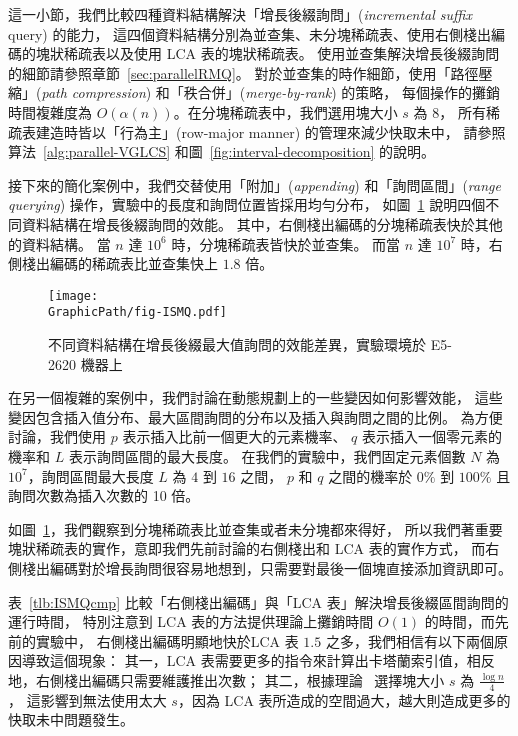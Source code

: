 這一小節，我們比較四種資料結構解決「增長後綴詢問」({\em incremental suffix} query) 的能力，
這四個資料結構分別為並查集、未分塊稀疏表、使用右側棧出編碼的塊狀稀疏表以及使用 LCA 表的塊狀稀疏表。
使用並查集解決增長後綴詢問的細節請參照章節~\ref{sec:parallelRMQ}。
對於並查集的時作細節，使用「路徑壓縮」({\em path compression}) 和「秩合併」({\em merge-by-rank}) 的策略，
每個操作的攤銷時間複雜度為 $O(\alpha(n))$。在分塊稀疏表中，我們選用塊大小 $s$ 為 $8$，
所有稀疏表建造時皆以「行為主」(row-major manner) 的管理來減少快取未中，
請參照算法~\ref{alg:parallel-VGLCS} 和圖~\ref{fig:interval-decomposition} 的說明。


接下來的簡化案例中，我們交替使用「附加」({\em appending}) 
和「詢問區間」({\em range querying}) 操作，實驗中的長度和詢問位置皆採用均勻分布，
如圖~\ref{fig:fig-ISMQcmp} 說明四個不同資料結構在增長後綴詢問的效能。
其中，右側棧出編碼的分塊稀疏表快於其他的資料結構。
當 $n$ 達 $10^6$ 時，分塊稀疏表皆快於並查集。
而當 $n$ 達 $10^7$ 時，右側棧出編碼的稀疏表比並查集快上 $1.8$ 倍。

\begin{figure}[!thb]
  \centering
  \texttt{[image: \\GraphicPath/fig-ISMQ.pdf]}
  \caption{
    不同資料結構在增長後綴最大值詢問的效能差異，實驗環境於 E5-2620 機器上}
  \label{fig:fig-ISMQcmp}
\end{figure}

在另一個複雜的案例中，我們討論在動態規劃上的一些變因如何影響效能，
這些變因包含插入值分布、最大區間詢問的分布以及插入與詢問之間的比例。
為方便討論，我們使用 $p$ 表示插入比前一個更大的元素機率、
$q$ 表示插入一個零元素的機率和 $L$ 表示詢問區間的最大長度。
在我們的實驗中，我們固定元素個數 $N$ 為 $10^7$，詢問區間最大長度 $L$ 為 $4$ 到 $16$ 之間，
$p$ 和 $q$ 之間的機率於 $0 \%$ 到 $100 \%$ 且詢問次數為插入次數的 10 倍。

如圖~\ref{fig:fig-ISMQcmp}，我們觀察到分塊稀疏表比並查集或者未分塊都來得好，
所以我們著重要塊狀稀疏表的實作，意即我們先前討論的右側棧出和 LCA 表的實作方式，
而右側棧出編碼對於增長詢問很容易地想到，只需要對最後一個塊直接添加資訊即可。

表~\ref{tlb:ISMQcmp} 比較「右側棧出編碼」與「LCA 表」解決增長後綴區間詢問的運行時間，
特別注意到 LCA 表的方法提供理論上攤銷時間 $O(1)$ 的時間，而先前的實驗中，
右側棧出編碼明顯地快於LCA 表 $1.5$ 之多，我們相信有以下兩個原因導致這個現象：
其一，LCA 表需要更多的指令來計算出卡塔蘭索引值，相反地，右側棧出編碼只需要維護推出次數；
其二，根據理論~\cite{Fischer2006TheoreticalAP} 選擇塊大小 $s$ 為 $\frac{\log n}{4}$，
這影響到無法使用太大 $s$，因為 LCA 表所造成的空間過大，越大則造成更多的快取未中問題發生。

